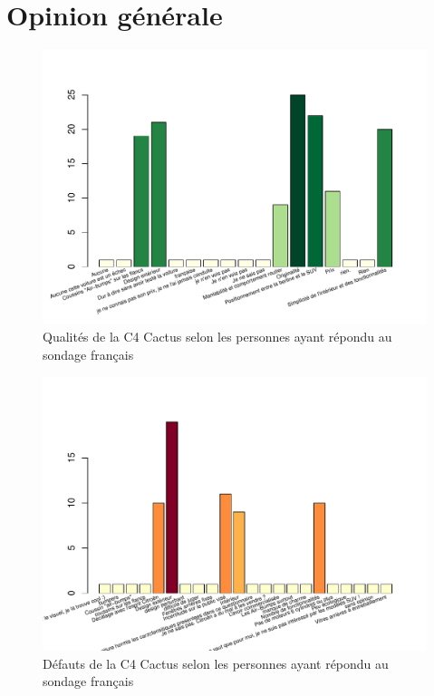 \documentclass[12pt]{article}\usepackage[]{graphicx}\usepackage[]{color}
\makeatletter
\def\maxwidth{ %
  \ifdim\Gin@nat@width>\linewidth
    \linewidth
  \else
    \Gin@nat@width
  \fi
}
\newenvironment{knitrout}{}{} %
\makeatother
\begin{document}
\break
\section{Opinion générale}



\begin{knitrout}
\color{fgcolor}\begin{figure}[H]
\includegraphics[width=\maxwidth]{figure/qualities_fr-1} \caption[Qualités de la C4 Cactus selon les personnes ayant répondu au sondage français]{Qualités de la C4 Cactus selon les personnes ayant répondu au sondage français}\label{fig:qualities fr}
\end{figure}


\end{knitrout}

\begin{knitrout}
\color{fgcolor}\begin{figure}[H]
\includegraphics[width=\maxwidth]{figure/flaws_fr-1} \caption[Défauts de la C4 Cactus selon les personnes ayant répondu au sondage français]{Défauts de la C4 Cactus selon les personnes ayant répondu au sondage français}\label{fig:flaws fr}
\end{figure}


\end{knitrout}
\end{document}
